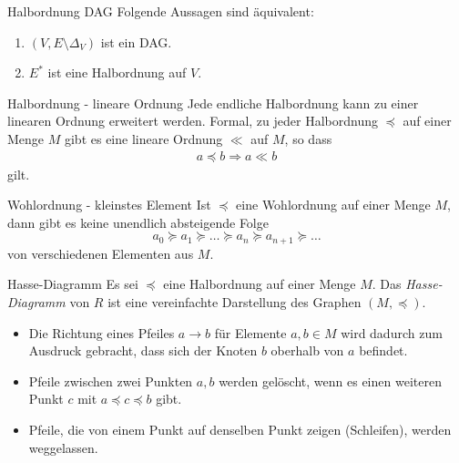 \begin{lemma}{Halbordnung DAG}
    Folgende Aussagen sind äquivalent:
    \begin{enumerate}
        \item $(V,E\setminus \Delta_V)$ ist ein DAG.
        \item $E^*$ ist eine Halbordnung auf $V$.
    \end{enumerate}
\end{lemma}

\begin{corollary}{Halbordnung - lineare Ordnung}
    Jede endliche Halbordnung kann zu einer linearen Ordnung erweitert werden. Formal, zu jeder Halbordnung $\preceq$ auf einer Menge $M$ gibt es eine lineare Ordnung $\ll$ auf $M$, so dass
    \begin{align*}
        a\preceq b \Rightarrow a\ll b
    \end{align*}
    gilt.
\end{corollary}

\begin{lemma}{Wohlordnung - kleinstes Element}
    Ist $\preceq$ eine Wohlordnung auf einer Menge $M$, dann gibt es keine unendlich absteigende Folge
    \[
        a_0\succeq a_1\succeq\dots\succeq a_n\succeq a_{n+1}\succeq\dots
    \]
    von verschiedenen Elementen aus $M$.
\end{lemma}

\begin{definition}{Hasse-Diagramm}
    Es sei $\preceq$ eine Halbordnung auf einer Menge $M$. Das \textit{Hasse-Diagramm} von $R$ ist eine vereinfachte Darstellung des Graphen $(M,\preceq)$.
    \begin{itemize}
        \item Die Richtung eines Pfeiles $a\to b$ für Elemente $a,b\in M$ wird dadurch zum Ausdruck gebracht, dass sich der Knoten $b$ oberhalb von $a$ befindet.
        \item Pfeile zwischen zwei Punkten $a,b$ werden gelöscht, wenn es einen weiteren Punkt $c$ mit $a\preceq c\preceq b$ gibt.
        \item Pfeile, die von einem Punkt auf denselben Punkt zeigen (Schleifen), werden weggelassen.
    \end{itemize}
\end{definition}
